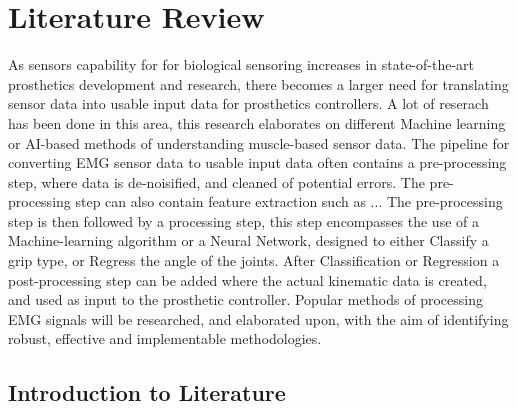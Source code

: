 \documentclass[../main.tex]{subfiles}
\begin{document}
\section{Literature Review}
\label{sec:literature}

As sensors capability for for biological sensoring increases in state-of-the-art prosthetics development and research, there becomes a larger need for translating sensor data into usable input data for prosthetics controllers.
A lot of reserach has been done in this area, this research elaborates on different Machine learning or AI-based methods of understanding muscle-based sensor data.
The pipeline for converting EMG sensor data to usable input data often contains a pre-processing step, where data is de-noisified, and cleaned of potential errors.
The pre-processing step can also contain feature extraction such as ...
The pre-processing step is then followed by a processing step, this step encompasses the use of a Machine-learning algorithm or a Neural Network, designed to either Classify a grip type, or Regress the angle of the joints.
After Classification or Regression a post-processing step can be added where the actual kinematic data is created, and used as input to the prosthetic controller. 
Popular methods of processing EMG signals will be researched, and elaborated upon, with the aim of identifying robust, effective and implementable methodologies.


\subsection{Introduction to Literature}
\end{document}
